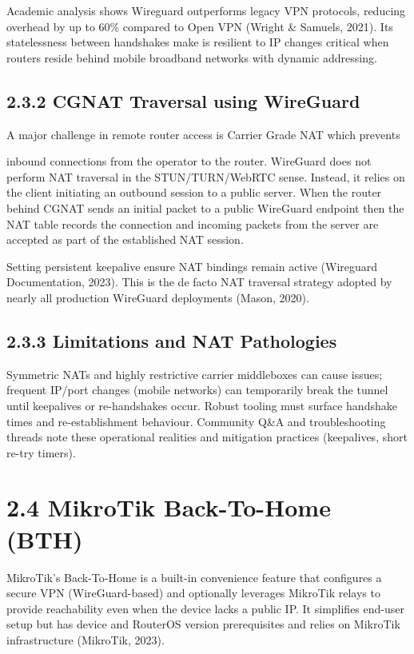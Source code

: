 \documentclass[12pt,a4paper,oneside]{report}
\begin{document}
Academic analysis shows Wireguard outperforms legacy VPN protocols, reducing overhead by up to 60\% compared to Open VPN (Wright \& Samuels, 2021). Its statelessness between handshakes make is resilient to IP changes critical when routers reside behind mobile broadband networks with dynamic addressing.




\subsection{2.3.2 CGNAT Traversal using WireGuard}

A major challenge in remote router access is Carrier Grade NAT which prevents


inbound connections from the operator to the router. WireGuard does not perform NAT traversal in the STUN/TURN/WebRTC sense. Instead, it relies on the client initiating an outbound session to a public server. When the router behind CGNAT sends an initial packet to a public WireGuard endpoint then the NAT table records the connection and incoming packets from the server are accepted as part of the established NAT session.


Setting persistent keepalive ensure NAT bindings remain active (Wireguard Documentation, 2023). This is the de facto NAT traversal strategy adopted by nearly all production WireGuard deployments (Mason, 2020).




\subsection{2.3.3 Limitations and NAT Pathologies}

Symmetric NATs and highly restrictive carrier middleboxes can cause issues; frequent IP/port changes (mobile networks) can temporarily break the tunnel until keepalives or re-handshakes occur. Robust tooling must surface handshake times and re-establishment behaviour. Community Q\&A and troubleshooting threads note these operational realities and mitigation practices (keepalives, short re-try timers).






\section{2.4 MikroTik Back-To-Home (BTH)}

MikroTik's Back-To-Home is a built-in convenience feature that configures a secure VPN (WireGuard-based) and optionally leverages MikroTik relays to provide reachability even when the device lacks a public IP. It simplifies end-user setup but has device and RouterOS version prerequisites and relies on MikroTik infrastructure (MikroTik, 2023).
\end{document}
